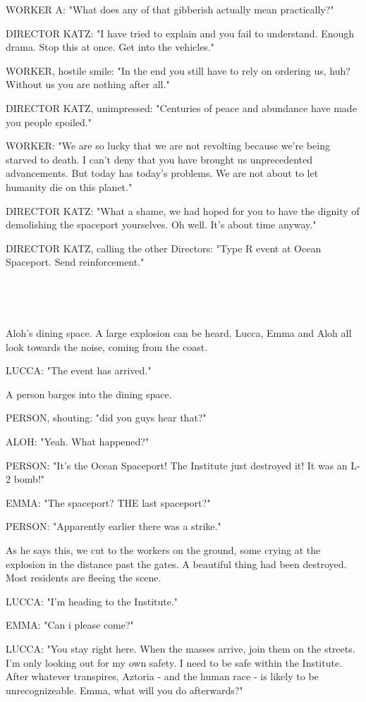 \documentclass[11pt]{article}
\begin{document}
WORKER A: "What does any of that gibberish actually mean practically?"

DIRECTOR KATZ: "I have tried to explain and you fail to understand.
Enough drama.
Stop this at once. 
Get into the vehicles."

WORKER, hostile smile: "In the end you still have to rely on ordering us, huh? 
Without us you are nothing after all."

DIRECTOR KATZ, unimpressed: "Centuries of peace and abundance have made you people spoiled."

WORKER: "We are so lucky that we are not revolting because we're being starved to death.
I can't deny that you have brought us unprecedented advancements.
But today has today's problems.
We are not about to let humanity die on this planet."

DIRECTOR KATZ: "What a shame, we had hoped for you to have the dignity of demolishing the spaceport yourselves. Oh well. 
It's about time anyway."

DIRECTOR KATZ, calling the other Directors: "Type R event at Ocean Spaceport.
Send reinforcement."

\ 

\ 

Aloh's dining space.
A large explosion can be heard. 
Lucca, Emma and Aloh all look towards the noise, coming from the coast.

LUCCA: "The event has arrived."

A person barges into the dining space.

PERSON, shouting: "did you guys hear that?"

ALOH: "Yeah. What happened?"

PERSON: "It's the Ocean Spaceport! 
The Institute just destroyed it! 
It was an L-2 bomb!"

EMMA: "The spaceport? THE last spaceport?"

PERSON: "Apparently earlier there was a strike."

As he says this, we cut to the workers on the ground, some crying at the explosion in the distance past the gates.
A beautiful thing had been destroyed.
Most residents are fleeing the scene. 

LUCCA: "I'm heading to the Institute."

EMMA: "Can i please come?"

LUCCA: "You stay right here. When the masses arrive, join them on the streets. 
I'm only looking out for my own safety. I need to be safe within the Institute.
After whatever transpires, Aztoria - and the human race - is likely to be unrecognizeable.
Emma, what will you do afterwards?"
\end{document}
